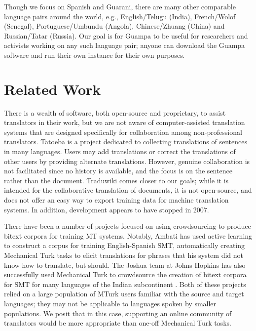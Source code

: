 \documentclass[10pt, a4paper]{article}
\begin{document}
Though we focus on Spanish and Guarani, there are many other comparable
language pairs around the world, e.g., English/Telugu (India), French/Wolof
(Senegal), Portuguese/Umbundu (Angola), Chinese/Zhuang (China) and
Russian/Tatar (Russia). Our goal is for Guampa to be useful for researchers and
activists working on any such language pair; anyone can download the Guampa
software and run their own instance for their own purposes.

\section{Related Work}
There is a wealth of software, both open-source and proprietary, to assist
translators in their work, but we are not aware of computer-assisted
translation systems that are designed specifically for collaboration among
non-professional translators. Tatoeba \cite{tatoeba} is a
project dedicated to collecting translations of sentences in many languages.
Users may add translations or correct the translations of other users by
providing alternate translations. However, genuine collaboration is not
facilitated since no history is available, and the focus is on the sentence
rather than the document. Traduwiki \cite{traduwiki} comes closer
to our goals; while it is intended for the collaborative translation of
documents, it is not open-source, and does not offer an easy way to export
training data for machine translation systems. In addition, development appears
to have stopped in 2007.

There have been a number of projects focused on using crowdsourcing to produce
bitext corpora for training MT systems. Notably, Ambati
\cite{ambati_naacl,ambati_act} has used active learning to construct a corpus
for training English-Spanish SMT, automatically creating Mechanical Turk tasks
to elicit translations for phrases that his system did not know how to
translate, but should. The Joshua team at Johns Hopkins has also successfully
used Mechanical Turk to crowdsource the creation of bitext corpora for SMT for
many languages of the Indian subcontinent
\cite{post-callisonburch-osborne:2012:WMT}. Both of these projects relied on a
large population of MTurk users familiar with the source and target languages;
they may not be applicable to languages spoken by smaller populations. We posit
that in this case, supporting an online community of translators would be more
appropriate than one-off Mechanical Turk tasks.
\end{document}

